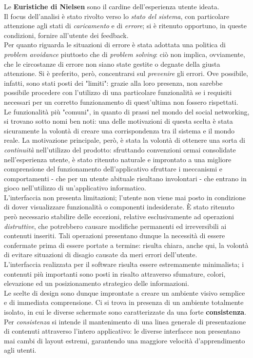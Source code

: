 \documentclass{natourDoc}
\begin{document}
Le \textbf{Euristiche di Nielsen} sono il cardine dell'esperienza utente ideata. \\
Il focus dell'analisi è stato rivolto verso lo \textit{stato del sistema}, con particolare attenzione agli stati di \textit{caricamento} e di \textit{errore};
si è ritenuto opportuno, in queste condizioni, fornire all'utente dei feedback. \\
Per quanto riguarda le situazioni di errore è stata adottata una politica di \textit{problem avoidance} piuttosto che di \textit{problem solving}: ciò non implica,
ovviamente, che le circostanze di errore non siano state gestite o degnate della giusta attenzione. Si è preferito, però, concentrarsi sul \textit{prevenire} gli errori.
Ove possibile, infatti, sono stati posti dei "limiti": grazie alla loro presenza, non sarebbe possibile procedere con l'utilizzo di una particolare funzionalità se
i requisiti necessari per un corretto funzionamento di quest'ultima non fossero rispettati. \\
Le funzionalità più "comuni", in quanto di prassi nel mondo del social networking, si trovano sotto nomi ben noti: una delle motivazioni di questa scelta è stata sicuramente la volontà di
creare una corrispondenza tra il sistema e il mondo reale. La motivazione principale, però, è stata la volontà di ottenere una sorta di \textit{continuità} nell'utilizzo del prodotto: sfruttando convenzioni ormai
consolidate nell'esperienza utente, è stato ritenuto naturale e improntato a una migliore comprensione del funzionamento dell'applicativo sfruttare i meccanismi
e comportamenti - che per un utente abituale risultano involontari - che entrano in gioco nell'utilizzo di un'applicativo informatico. \\
L'interfaccia non presenta limitazioni; l'utente non viene mai posto in condizione di dover visualizzare funzionalità o componenti indesiderate.
È stato ritenuto però necessario stabilire delle eccezioni, relative esclusivamente ad operazioni \textit{distruttive}, che potrebbero causare modifiche permanenti ed irreversibili
ai contenuti inseriti. Tali operazioni presentano dunque la necessità di essere confermate prima di essere portate a termine: risulta chiara, anche qui, la volontà di evitare
situazioni di disagio causate da meri errori dell'utente.\\
L'interfaccia realizzata per il software risulta essere estremamente minimalista; i contenuti più importanti sono posti in risalto attraverso sfumature, colori, elevazione ed un
posizionamento strategico delle informazioni. \\
Le scelte di design sono dunque improntate a creare un ambiente visivo semplice e di immediata comprensione.
Ci si trova in presenza di un ambiente totalmente isolato, in cui le diverse schermate sono caratterizzate da una forte
\textbf{consistenza}. Per \textit{consistenza} si intende il mantenimento di una linea generale di presentazione di contenuti attraverso
l'intero applicativo: le diverse interfacce non presentano mai cambi di layout estremi, garantendo una maggiore velocità d'apprendimento agli utenti. \\
\end{document}
